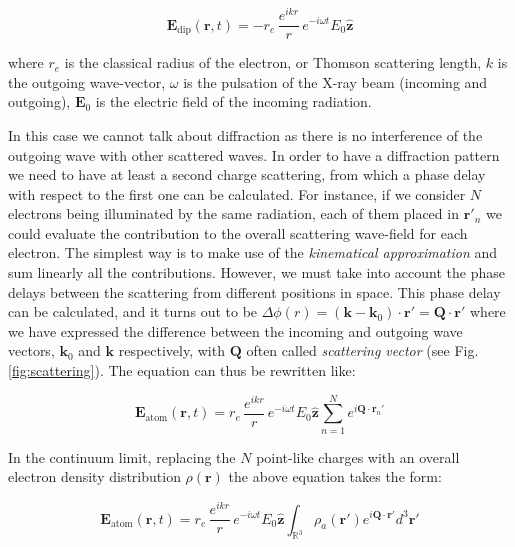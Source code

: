 \begin{equation}
    \mathbf{E}_{\text{dip}}(\mathbf{r},t) 
    = -r_e \, \frac{e^{ikr}}{r} \, e^{-i \omega t} 
    E_0 \mathbf{\hat{z}}
    \label{eq:scattering_pointlike}
\end{equation}

where $r_e$ is the classical radius of the electron, or Thomson scattering length, $k$ is the outgoing wave-vector, $\omega$ is the pulsation of the 
X-ray beam (incoming and outgoing), $\mathbf{E}_0$ is the electric field of the incoming radiation.

In this case we cannot talk about diffraction as there is no interference of the outgoing wave with other scattered waves. In order 
to have a diffraction pattern we need to have at least a second charge scattering, from which a phase 
delay with respect to the first one can be calculated. For instance, if we consider $N$ electrons being illuminated by the 
same radiation, each of them placed in $\mathbf{r'}_n$ we could evaluate the contribution to the overall scattering 
wave-field for each electron. 
The simplest way is to make use of the \textit{kinematical approximation} and sum linearly all the contributions. However, we must 
take into account the phase delays between the scattering from different positions in space. 
This phase delay can be calculated, and it turns out to be $\Delta\phi(r) = (\mathbf k - \mathbf {k}_0)\cdot \mathbf{r}' = \mathbf Q \cdot \mathbf{r}'$ 
where we have expressed the difference between the incoming and outgoing wave vectors, $\mathbf {k}_0$ and $\mathbf k$ respectively, 
with $\mathbf{Q}$ often called \textit{scattering vector} (see Fig.\ref{fig:scattering}).
The equation can thus be rewritten like: 

\begin{equation}
    \mathbf{E}_{\text{atom}}(\mathbf{r},t) 
    = r_e \, \frac{e^{ikr}}{r} \, e^{-i \omega t} 
    E_0 \mathbf{\hat{z}}
    \sum_{n = 1}^{N} e^{i \mathbf{Q} \cdot \mathbf{r}_n'} 
    \label{eq:scattering_electrons}
\end{equation}

In the continuum limit, replacing the $N$ point-like charges with an overall electron density distribution $\rho(\mathbf r)$ 
the above equation takes the form: 

\begin{equation}
    \mathbf{E}_{\text{atom}}(\mathbf{r},t) 
    = r_e \, \frac{e^{ikr}}{r} \, e^{-i \omega t} 
    E_0 \mathbf{\hat{z}}
    \int_{\mathbb{R}^3} \rho_a(\mathbf r') e^{i \mathbf{Q} \cdot \mathbf{r}'}  d^3 \mathbf r'
    \label{eq:scattering_atom}
\end{equation}

